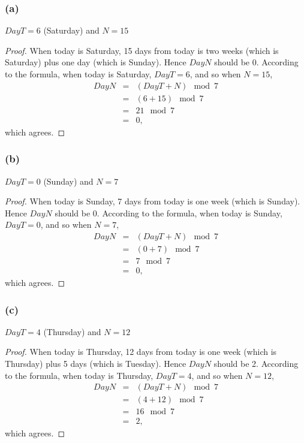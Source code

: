 \documentclass[14pt]{extarticle}
\begin{document}
\subsubsection{(a)}
$DayT = 6$ (Saturday) and $N = 15$

\begin{proof}
When today is Saturday, 15 days from today is two weeks (which is Saturday) plus one day (which is Sunday). Hence $DayN$ should be 0. According to the formula, when today is Saturday, $DayT = 6$, and so when $N = 15$,
\[
\begin{array}{rcl}
DayN &=& (DayT + N) \mod 7 \\
&=& (6 + 15) \mod 7 \\
&=& 21 \mod 7 \\
&=& 0,
\end{array}
\]
which agrees.
\end{proof}

\subsubsection{(b)}
$DayT = 0$ (Sunday) and $N = 7$

\begin{proof}
When today is Sunday, 7 days from today is one week (which is Sunday). Hence $DayN$ should be 0. According to the formula, when today is Sunday, $DayT = 0$, and so when $N = 7$,
\[
\begin{array}{rcl}
DayN &=& (DayT + N) \mod 7 \\
&=& (0 + 7) \mod 7 \\
&=& 7 \mod 7 \\
&=& 0,
\end{array}
\]
which agrees.
\end{proof}

\subsubsection{(c)}
$DayT = 4$ (Thursday) and $N = 12$

\begin{proof}
When today is Thursday, 12 days from today is one week (which is Thursday) plus 5 days (which is Tuesday). Hence $DayN$ should be 2. According to the formula, when today is Thursday, $DayT = 4$, and so when $N = 12$,
\[
\begin{array}{rcl}
DayN &=& (DayT + N) \mod 7 \\
&=& (4 + 12) \mod 7 \\
&=& 16 \mod 7 \\
&=& 2,
\end{array}
\]
which agrees.
\end{proof}
\end{document}
